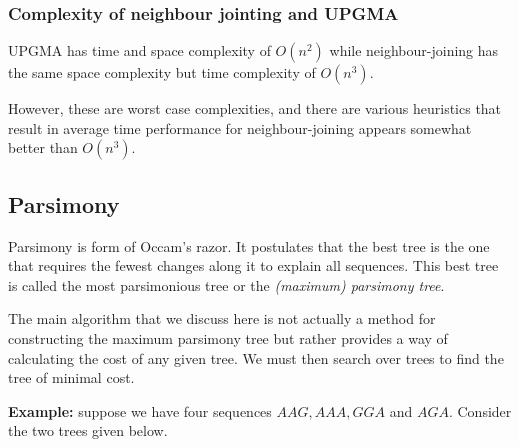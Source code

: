 \documentclass[11pt]{article}
\begin{document}
\subsubsection{Complexity of neighbour jointing and UPGMA}

UPGMA has time and space complexity of $O(n^2)$ while neighbour-joining has the same space complexity but time complexity of $O(n^3)$.  

However, these are worst case complexities, and there are various heuristics that result in average time performance for neighbour-joining appears somewhat better than $O(n^3)$.




\subsection{Parsimony}
\label{sec:parsimony}

Parsimony is  form of Occam's razor. It postulates that the best tree is the one that requires the fewest changes along it to explain all sequences.  This best tree is called the most parsimonious tree or the {\em (maximum)  parsimony tree}.  

The main algorithm that we discuss here is not actually a method for constructing the maximum parsimony tree  but rather provides a way of calculating the cost of any given tree.  We must then search over trees to find the tree of minimal cost.

{\bf Example:} suppose we have four sequences $AAG, AAA, GGA$ and $AGA$.  Consider the two trees given below.
\end{document}

